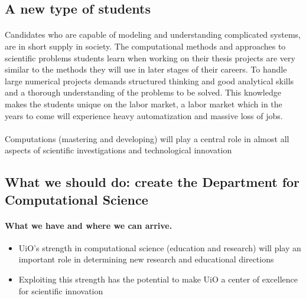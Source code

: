 \documentclass[%
oneside,                 %
final,                   %
10pt]{article}
\begin{document}
\subsection{A new type of students}

\paragraph{}
Candidates who are capable of modeling and understanding complicated
systems, are in short supply in society.  The
computational methods and approaches to scientific problems students learn
when working on their thesis projects are very similar to the methods
they will use in later stages of their careers.  To handle large
numerical projects demands structured thinking and good analytical
skills and a thorough understanding of the problems to be solved. This
knowledge makes the students unique on the labor market, a labor market which in the years to come will experience heavy automatization and massive loss of jobs.




\paragraph{}
Computations (mastering and developing)  will play a central role in almost all aspects of scientific investigations and technological innovation





\subsection{What we should do: create the Department  for Computational Science}

\paragraph{What we have and where we can arrive.}
\begin{itemize}
\item UiO's strength in computational science (education and research) will play an important role in  determining new research and educational directions

\item Exploiting this strength has the potential to make UiO a center of excellence for scientific innovation
\end{itemize}
\end{document}
